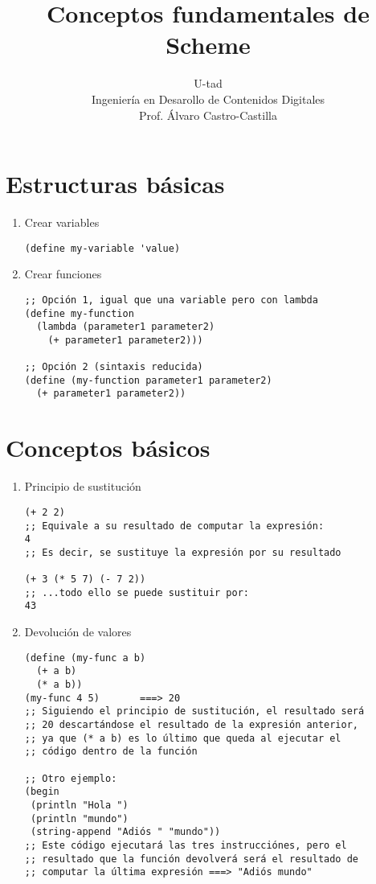 \documentclass[a4paper,oneside]{article}
\title{Conceptos fundamentales de Scheme}
\author{U-tad\\ Ingeniería en Desarollo de Contenidos Digitales\\ Prof. Álvaro Castro-Castilla}
\date{}
\begin{document}
\maketitle


\section{Estructuras básicas}
\begin{enumerate}
  \item Crear variables

    \begin{verbatim}
(define my-variable 'value)
    \end{verbatim}

  \item Crear funciones

    \begin{verbatim}
;; Opción 1, igual que una variable pero con lambda
(define my-function
  (lambda (parameter1 parameter2)
    (+ parameter1 parameter2)))

;; Opción 2 (sintaxis reducida)
(define (my-function parameter1 parameter2)
  (+ parameter1 parameter2))
    \end{verbatim}

\end{enumerate}

\section{Conceptos básicos}
\begin{enumerate}
  \item Principio de sustitución

    \begin{verbatim}
(+ 2 2)
;; Equivale a su resultado de computar la expresión:
4
;; Es decir, se sustituye la expresión por su resultado

(+ 3 (* 5 7) (- 7 2))
;; ...todo ello se puede sustituir por:
43
    \end{verbatim}

\pagebreak
  \item Devolución de valores

    \begin{verbatim}
(define (my-func a b)
  (+ a b)
  (* a b))
(my-func 4 5)       ===> 20
;; Siguiendo el principio de sustitución, el resultado será
;; 20 descartándose el resultado de la expresión anterior,
;; ya que (* a b) es lo último que queda al ejecutar el
;; código dentro de la función

;; Otro ejemplo:
(begin
 (println "Hola ")
 (println "mundo")
 (string-append "Adiós " "mundo"))
;; Este código ejecutará las tres instrucciónes, pero el
;; resultado que la función devolverá será el resultado de
;; computar la última expresión ===> "Adiós mundo"
    \end{verbatim}

\end{enumerate}
\end{document}
